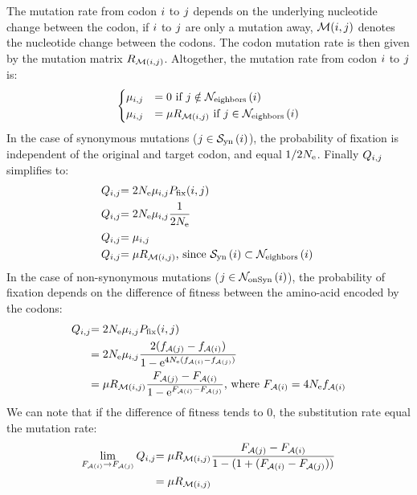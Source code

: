 The mutation rate from \gls{codon} ${i}$ to ${j}$ depends on the underlying nucleotide change between the \gls{codon}, if ${i}$ to ${j}$ are only a mutation away, $\mathcal{M}({i}, {j})$ denotes the nucleotide change between the codons. The \gls{codon} mutation rate is then given by the mutation matrix ${R_{\mathcal{M}({i}, {j})}}$. Altogether, the mutation rate from \gls{codon} ${i}$ to ${j}$ is:
\begin{equation}
\begin{dcases}
\mu_{{i}, {j}} & = 0 \text{ if } {j} \notin \mathcal{N}_{\mathrm{eighbors}}\left({i}\right) \\
\mu_{{i}, {j}} & = \mu R_{\mathcal{M}({i}, {j})} \text{ if } {j} \in \mathcal{N}_{\mathrm{eighbors}}\left({i}\right)
\end{dcases}
\end{equation}
In the case of synonymous mutations (${j} \in \mathcal{S}_{\mathrm{yn}}\left({i}\right) $), the probability of fixation is independent of the original and target \gls{codon}, and equal $1/2 N_{\textrm{e}}$. Finally ${Q_{{i}, {j}}}$ simplifies to: 
\begin{align}
{Q_{{i}, {j}}} & { = 2 N_{\textrm{e}} \mu_{{i}, {j}}  P_{\mathrm{fix}}}({i}, {j}) \nonumber \\
{Q_{{i}, {j}}} & { = 2 N_{\textrm{e}} \mu_{{i}, {j}} \dfrac{1}{2N_{\textrm{e}}}} \nonumber \\
{Q_{{i}, {j}}} & { =  \mu_{{i}, {j}} } \nonumber \\
{Q_{{i}, {j}}} & { =  \mu R_{\mathcal{M}({i}, {j})} }\text{, since } \mathcal{S}_{\mathrm{yn}}\left({i}\right) \subset \mathcal{N}_{\mathrm{eighbors}}\left({i}\right) \
\end{align}
In the case of non-synonymous mutations (${j} \in \mathcal{N}_{\mathrm{onSyn}}\left({i}\right) $), the probability of fixation depends on the difference of fitness between the amino-acid encoded by the codons:
\begin{align}
{Q_{{i}, {j}}} & { = 2 N_{\textrm{e}} \mu_{{i}, {j}} P_{\mathrm{fix}}}({i}, {j}) \nonumber \\
& { = 2 N_{\textrm{e}} \mu_{{i}, {j}} }  \dfrac{2({f_{\mathcal{A}({j})} - f_{\mathcal{A}({i})}})}{{1 - \mathrm{e}^{4N_{\textrm{e}}(f_{\mathcal{A}({i})} - f_{\mathcal{A}({j})})} }} \nonumber \\
& { = \mu R_{\mathcal{M}({i}, {j})} }  \dfrac{{F_{\mathcal{A}({j})} - F_{\mathcal{A}({i})}}}{{1 - \mathrm{e}^{F_{\mathcal{A}({i})} - F_{\mathcal{A}({j})}} }}\text{, where } F_{\mathcal{A}({i})} = 4N_{\textrm{e}} f_{\mathcal{A}({i})}
\end{align}
We can note that if the difference of fitness tends to $0$, the \gls{substitution} rate equal the mutation rate:
\begin{align}
\lim_{F_{\mathcal{A}({i})} \to F_{\mathcal{A}({j})}} {Q_{{i}, {j}}} & { = \mu R_{\mathcal{M}({i}, {j})} }  \dfrac{{F_{\mathcal{A}({j})} - F_{\mathcal{A}({i})}}}{{1 - (1  + (F_{\mathcal{A}({i})} - F_{\mathcal{A}({j})})) }} \nonumber \\
& { =  \mu R_{\mathcal{M}({i}, {j})} } 
\end{align}

